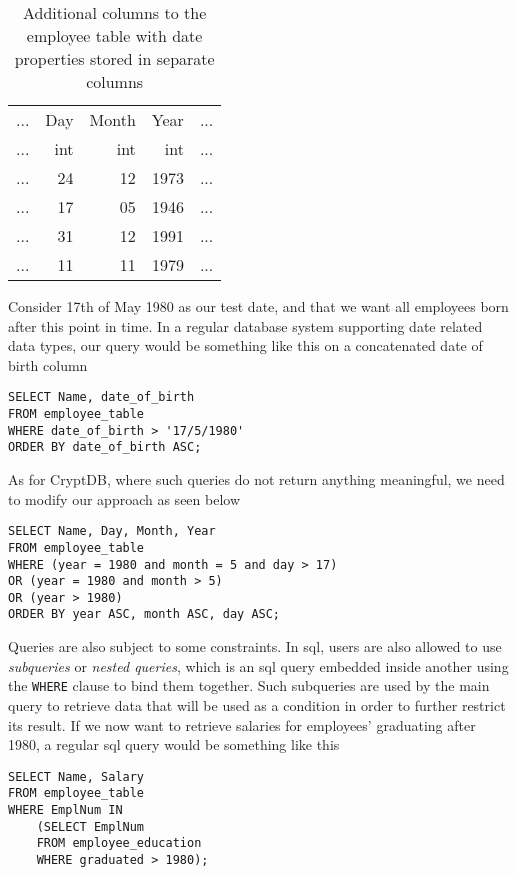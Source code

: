 \newpage

\begin{table}[H]
\label{tab:empl_tab_mod}
\centering
\begin{tabular}{| c | r | r | r | c |}
\hline
  ... & Day & Month & Year & ... \\
  ... & int & int & int & ... \\
 \hline \hline
 ... & 24 & 12 & 1973  & ... \\
 ... & 17 & 05 & 1946 & ... \\
 ... & 31 & 12 & 1991 & ... \\
 ... & 11 & 11 & 1979  & ... \\
 \hline

\end{tabular}
\caption{Additional columns to the employee table with date properties stored in separate columns}
\end{table}

Consider 17th of May 1980 as our test date, and that we want all employees born after this point in time. In a regular database system supporting date related data types, our query would be something like this on a concatenated date of birth column

\begin{verbatim}
SELECT Name, date_of_birth
FROM employee_table
WHERE date_of_birth > '17/5/1980'
ORDER BY date_of_birth ASC;
\end{verbatim}

As for CryptDB, where such queries do not return anything meaningful, we need to modify our approach as seen below

\begin{verbatim}
SELECT Name, Day, Month, Year
FROM employee_table
WHERE (year = 1980 and month = 5 and day > 17)
OR (year = 1980 and month > 5)
OR (year > 1980)
ORDER BY year ASC, month ASC, day ASC;
\end{verbatim}

Queries are also subject to some constraints. In \gls{sql}, users are also allowed to use \emph{subqueries} or \emph{nested queries}, which is an \gls{sql} query embedded inside another using the \verb!WHERE! clause to bind them together. Such subqueries are used by the main query to retrieve data that will be used as a condition in order to further restrict its result. If we now want to retrieve salaries for employees' graduating after 1980, a regular \gls{sql} query would be something like this

\begin{verbatim}
SELECT Name, Salary
FROM employee_table
WHERE EmplNum IN
    (SELECT EmplNum
    FROM employee_education
    WHERE graduated > 1980);
\end{verbatim}

